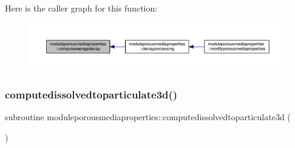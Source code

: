 Here is the caller graph for this function\+:\nopagebreak
\begin{figure}[H]
\begin{center}
\leavevmode
\includegraphics[width=350pt]{namespacemoduleporousmediaproperties_a3d3bfa08325114d10c44b11e29d42d78_icgraph}
\end{center}
\end{figure}
\mbox{\label{namespacemoduleporousmediaproperties_a2438c1ae6e14a9ddbc08eda6cd410daf}} 
\subsubsection{\texorpdfstring{computedissolvedtoparticulate3d()}{computedissolvedtoparticulate3d()}}
{\footnotesize\ttfamily subroutine moduleporousmediaproperties\+::computedissolvedtoparticulate3d (\begin{DoxyParamCaption}{ }\end{DoxyParamCaption})\hspace{0.3cm}{\ttfamily [private]}}

